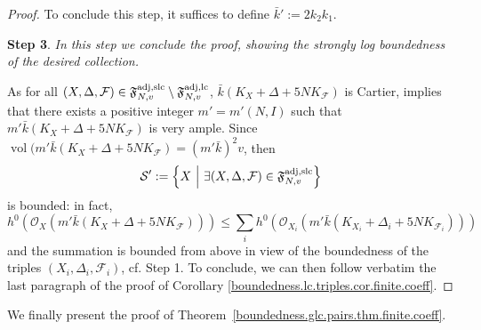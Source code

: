 \documentclass[12pt, a4paper]{amsart}
\DeclareMathOperator{\vol}{\mathrm{vol}}
\newcommand{\setfoliation}[1]{\mathfrak F^{\rm adj, #1}_{N, v}}
\newcounter{Theorem}
\theoremstyle{definition}
\theoremstyle{named}
\begin{document}
\begin{proof}
To conclude this step, it suffices to define 
$\bar k' := 2k_2k_1$.


\medskip

{\bf Step 3}.
{\it In this step we conclude the proof, showing the strongly log boundedness of the desired collection.}

As for all 
$(X, \Delta, \mathcal F) \in \setfoliation{slc} \setminus \setfoliation{lc}$, 
$\bar k(K_X+\Delta +5NK_{\mathcal F})$
is Cartier, 
\cite[Corollary 1.4]{fujino-2016}
implies that there exists a positive integer
$m'=m'(N, I)$ 
such that 
$m'\bar k(K_X+\Delta +5NK_{\mathcal F})$
is very ample.
Since 
$\vol(m'\bar k(K_X+\Delta +5NK_{\mathcal F})=(m'\bar k)^2v$,  
then
\begin{align*}
	\mathcal S' :=
	\left \{
	X \
	\middle \vert \
	\exists (X, \Delta, \mathcal F) \in \setfoliation{slc}
	\right \}
\end{align*}
is bounded: in fact, 
\[
h^0(\mathcal O_X(m'\bar k(K_X+\Delta +5NK_{\mathcal F})))
\leq 
\sum_{i} 
h^0(\mathcal O_{X_i}(m'\bar k(K_{X_i}+\Delta_i +5NK_{\mathcal F_i})))
\]
and the summation is bounded from above in view of the boundedness of the triples 
$(X_i, \Delta_i, \mathcal F_i)$, cf. Step 1.
To conclude, we can then follow verbatim the last paragraph of the proof of Corollary \ref{boundedness.lc.triples.cor.finite.coeff}.
\end{proof}


We finally present the proof of Theorem~\ref{boundedness.glc.pairs.thm.finite.coeff}.
\end{document}
